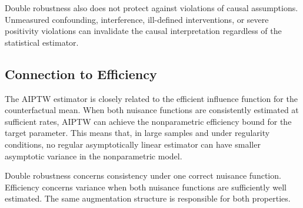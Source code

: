 Double robustness also does not protect against violations of causal assumptions.
Unmeasured confounding, interference, ill-defined interventions, or severe
positivity violations can invalidate the causal interpretation regardless of the
statistical estimator.

\subsection{Connection to Efficiency}

The AIPTW estimator is closely related to the efficient influence function for the
counterfactual mean. When both nuisance functions are consistently estimated at
sufficient rates, AIPTW can achieve the nonparametric efficiency bound for the target
parameter. This means that, in large samples and under regularity conditions, no
regular asymptotically linear estimator can have smaller asymptotic variance in the
nonparametric model.

\begin{keyidea}
Double robustness concerns consistency under one correct nuisance function.
Efficiency concerns variance when both nuisance functions are sufficiently well
estimated. The same augmentation structure is responsible for both properties.
\end{keyidea}
